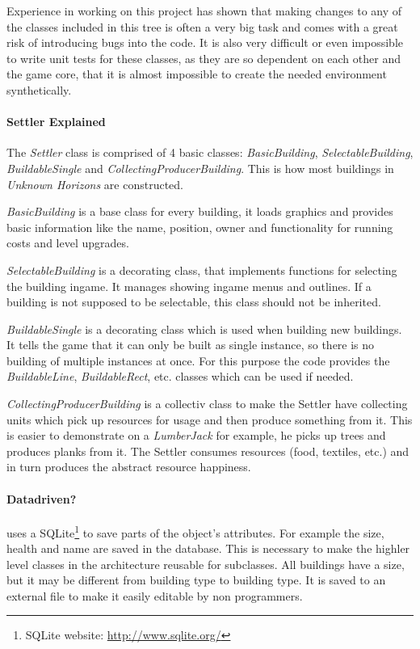 Experience in working on this project has shown that making changes to any of the classes included in this tree is often
a very big task and comes with a great risk of introducing bugs into the code. It is also very difficult or even
impossible to write unit tests for these classes, as they are so dependent on each other and the game core, that it is
almost impossible to create the needed environment synthetically.

\paragraph{Settler Explained}
The \textit{Settler} class is comprised of 4 basic classes: \textit{BasicBuilding}, \textit{SelectableBuilding},
\textit{BuildableSingle} and \textit{CollectingProducerBuilding}. This is how most buildings in \textit{Unknown
Horizons} are constructed. 

\textit{BasicBuilding} is a base class for every building, it loads graphics and provides
basic information like the name, position, owner and functionality for running costs and level upgrades.

\textit{SelectableBuilding} is a decorating class, that implements functions for selecting the building ingame. It
manages showing ingame menus and outlines. If a building is not supposed to be selectable, this class should not be
inherited.

\textit{BuildableSingle} is a decorating class which is used when building new buildings. It tells the game that it can
only be built as single instance, so there is no building of multiple instances at once. For this purpose the code
provides the \textit{BuildableLine}, \textit{BuildableRect}, etc. classes which can be used if needed.

\textit{CollectingProducerBuilding} is a collectiv class to make the Settler have collecting units which pick up
resources for usage and then produce something from it. This is easier to demonstrate on a \textit{LumberJack} for
example, he picks up trees and produces planks from it. The Settler consumes resources (food, textiles, etc.) and in
turn produces the abstract resource happiness.

\paragraph{Datadriven?}
\UH{} uses a SQLite\footnote{SQLite website: \url{http://www.sqlite.org/}} to save parts of the object's
attributes. For example the size, health and name are saved in the database. This is necessary to make the highler level
classes in the architecture reusable for subclasses. All buildings have a size, but it may be different from building
type to building type. It is saved to an external file to make it easily editable by non programmers.

